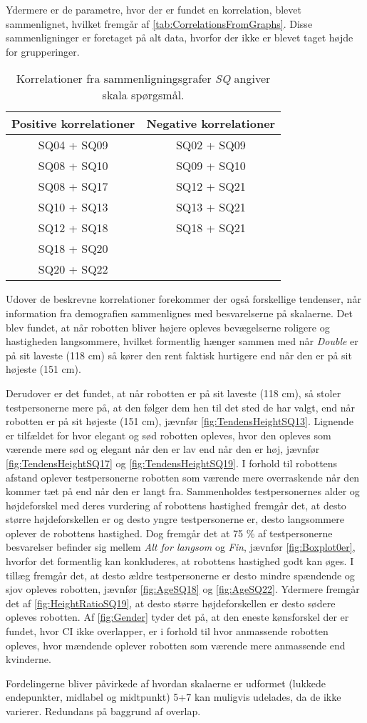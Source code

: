 %
Ydermere er de parametre, hvor der er fundet en korrelation, blevet sammenlignet, hvilket fremgår af \autoref{tab:CorrelationsFromGraphs}. Disse sammenligninger er foretaget på alt data, hvorfor der ikke er blevet taget højde for grupperinger.
%
\begin{table}[H]
	\centering
	\begin{tabular}{ c|c }
		\centering
		Positive korrelationer & Negative korrelationer \\ \hline
		SQ04 + SQ09 & SQ02 + SQ09 \\ 
		SQ08 + SQ10 & SQ09 + SQ10 \\ 
		SQ08 + SQ17 & SQ12 + SQ21 \\ 
		SQ10 + SQ13 & SQ13 + SQ21 \\ 
		SQ12 + SQ18 & SQ18 + SQ21	\\	
		SQ18 + SQ20 & 							\\
		SQ20 + SQ22 & 
	\end{tabular}        
\caption{Korrelationer fra sammenligningsgrafer \textit{SQ} angiver skala spørgsmål.}
\label{tab:CorrelationsFromGraphs} 
\end{table}
\noindent
%
Udover de beskrevne korrelationer forekommer der også forskellige tendenser, når information fra demografien sammenlignes med besvarelserne på skalaerne. Det blev fundet, at når robotten bliver højere opleves bevægelserne roligere og hastigheden langsommere, hvilket formentlig hænger sammen med når \textit{Double} er på sit laveste (118 cm) så kører den rent faktisk hurtigere end når den er på sit højeste (151 cm). 

Derudover er det fundet, at når robotten er på sit laveste (118 cm), så stoler testpersonerne mere på, at den følger dem hen til det sted de har valgt, end når robotten er på sit højeste (151 cm), jævnfør \autoref{fig:TendensHeightSQ13}. Lignende er tilfældet for hvor elegant og sød robotten opleves, hvor den opleves som værende mere sød og elegant når den er lav end når den er høj, jævnfør \autoref{fig:TendensHeightSQ17} og \autoref{fig:TendensHeightSQ19}. I forhold til robottens afstand oplever testpersonerne robotten som værende mere overraskende når den kommer tæt på end når den er langt fra. Sammenholdes testpersonernes alder og højdeforskel med deres vurdering af robottens hastighed fremgår det, at desto større højdeforskellen er og desto yngre testpersonerne er, desto langsommere oplever de robottens hastighed. Dog fremgår det at 75 \% af testpersonerne besvarelser befinder sig mellem \textit{Alt for langsom} og \textit{Fin}, jævnfør \autoref{fig:Boxplot0er}, hvorfor det formentlig kan konkluderes, at robottens hastighed godt kan øges. I tillæg fremgår det, at desto ældre testpersonerne er desto mindre spændende og sjov opleves robotten, jævnfør \autoref{fig:AgeSQ18} og \autoref{fig:AgeSQ22}. Ydermere fremgår det af \autoref{fig:HeightRatioSQ19}, at desto større højdeforskellen er desto sødere opleves robotten. Af \autoref{fig:Gender} tyder det på, at den eneste kønsforskel der er fundet, hvor CI ikke overlapper, er i forhold til hvor anmassende robotten opleves, hvor mændende oplever robotten som værende mere anmassende end kvinderne.\blankline
%


Fordelingerne bliver påvirkede af hvordan skalaerne er udformet (lukkede endepunkter, midlabel og midtpunkt)
5+7 kan muligvis udelades, da de ikke varierer.
Redundans på baggrund af overlap.
